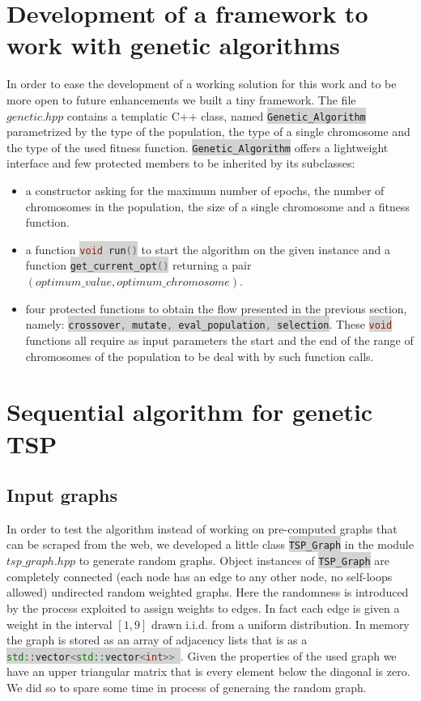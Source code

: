 \documentclass[11pt]{article}
\newcommand{\inlinecode}[2]{\colorbox{lightgray}{\lstinline[language=#1]$#2$}}
\begin{document}
\section{Development of a framework to work with genetic algorithms}
In order to ease the development of a working solution for this work and to be more open to future enhancements we built a tiny framework. The file $ genetic.hpp $ contains a templatic C++ class, named \inlinecode{C++}{Genetic_Algorithm} parametrized by the type of the population, the type of a single chromosome and the type of the used fitness function. \inlinecode{C++}{Genetic_Algorithm} offers a lightweight interface and few protected members to be inherited by its subclasses:
\begin{itemize}
	\item a constructor asking for the maximum number of epochs, the number of chromosomes in the population, the size of a single chromosome and a fitness function.
	\item a function \inlinecode{C++}{void run()} to start the algorithm on the given instance and a function \inlinecode{C++}{get_current_opt()} returning a pair $ (optimum\_value, optimum\_chromosome) $.
	\item four protected functions to obtain the flow presented in the previous section, namely: \inlinecode{C++}{crossover, mutate, eval_population, selection}. These \inlinecode{C++}{void} functions all require as input parameters the start and the end of the range of chromosomes of the population to be deal with by such function calls.
\end{itemize}

\section{Sequential algorithm for genetic TSP}
\subsection{Input graphs}
In order to test the algorithm instead of working on pre-computed graphs that can be scraped from the web, we developed a little class \inlinecode{C++}{TSP_Graph} in the module $ tsp\_graph.hpp $ to generate random graphs. Object instances of \inlinecode{C++}{TSP_Graph} are completely connected (each node has an edge to any other node, no self-loops allowed) undirected random weighted graphs. Here the randomness is introduced by the process exploited to assign weights to edges. In fact each edge is given a weight in the interval $ [1,9] $ drawn i.i.d. from a uniform distribution. In memory the graph is stored as an array of adjacency lists that is as a \inlinecode{C++}{std::vector<std::vector<int>> }. Given the properties of the used graph we have an upper triangular matrix that is every element below the diagonal is zero. We did so to spare some time in process of generaing the random graph.
\end{document}
